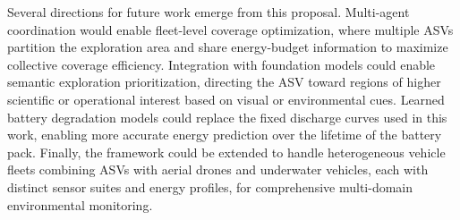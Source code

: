 \documentclass[conference]{IEEEtran}
\begin{document}
Several directions for future work emerge from this proposal. Multi-agent coordination would enable fleet-level coverage optimization, where multiple ASVs partition the exploration area and share energy-budget information to maximize collective coverage efficiency. Integration with foundation models could enable semantic exploration prioritization, directing the ASV toward regions of higher scientific or operational interest based on visual or environmental cues. Learned battery degradation models could replace the fixed discharge curves used in this work, enabling more accurate energy prediction over the lifetime of the battery pack. Finally, the framework could be extended to handle heterogeneous vehicle fleets combining ASVs with aerial drones and underwater vehicles, each with distinct sensor suites and energy profiles, for comprehensive multi-domain environmental monitoring.




\nocite{*}
\end{document}
